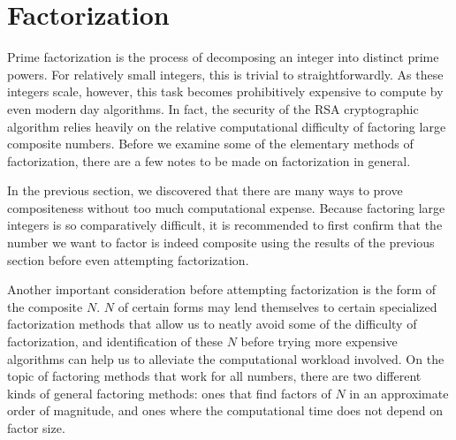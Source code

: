 \documentclass{article}
\begin{document}
\newpage

\section{Factorization}\label{Factorization}

\par Prime factorization is the process of decomposing an integer into distinct prime powers.
For relatively small integers, this is trivial to straightforwardly. As these integers scale, however, this task
becomes prohibitively expensive to compute by even modern day algorithms. In fact, the security of the RSA
cryptographic algorithm relies heavily on the relative computational difficulty of factoring large composite numbers.
Before we examine some of the elementary methods of factorization, there are a few notes to be made on factorization
in general.

\par In the previous section, we discovered that there are many ways to prove compositeness without 
too much computational expense. Because factoring large integers is so comparatively difficult, it is recommended
to first confirm that the number we want to factor is indeed composite using the results of the previous section before
even attempting factorization.

\par Another important consideration before attempting factorization is the form of the composite $N$. 
$N$ of certain forms may lend themselves to certain specialized factorization methods that allow us to neatly avoid
some of the difficulty of factorization, and identification of these $N$ before trying more expensive algorithms can
help us to alleviate the computational workload involved. On the topic of factoring methods that work for all numbers,
there are two different kinds of general factoring methods: ones that find factors of $N$ in an approximate order of
magnitude, and ones where the computational time does not depend on factor size.
\end{document}
